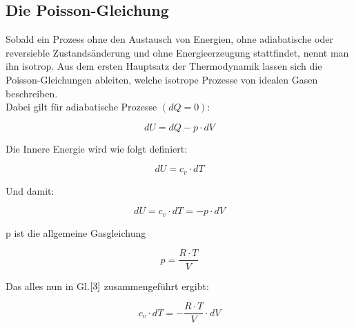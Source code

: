 \documentclass{article}
\begin{document}
{\begin{center}
\begin{minipage}{\linewidth}
\centering
{}
\label{sch}
\end{minipage}
\end{center}

\subsection{Die Poisson-Gleichung}
Sobald ein Prozess ohne den Austausch von Energien, ohne adiabatische oder reversieble Zustandsänderung und ohne Energieerzeugung stattfindet, nennt man ihn isotrop. Aus dem ersten Hauptsatz der Thermodynamik lassen sich die Poisson-Gleichungen ableiten, welche isotrope Prozesse von idealen Gasen beschreiben.\\

Dabei gilt für adiabatische Prozesse \((dQ=0)\):

\begin{equation}
\label{1}
dU=dQ-p \cdot dV
\end{equation}

Die Innere Energie wird wie folgt definiert:

\begin{equation}
\label{2}
dU=c_{v} \cdot dT
\end{equation}

Und damit:

\begin{equation}
\label{3}
dU=c_{v} \cdot dT=-p \cdot dV
\end{equation}

p ist die allgemeine Gasgleichung 

\begin{equation}
\label{4}
p= \frac{R \cdot T}{V}
\end{equation}

Das alles nun in Gl.\(\eqref{3}\) zusammengeführt ergibt:

\begin{equation}
\label{5}
c_{v} \cdot dT=- \frac{R \cdot T}{V} \cdot dV
\end{equation}

}
\end{document}
